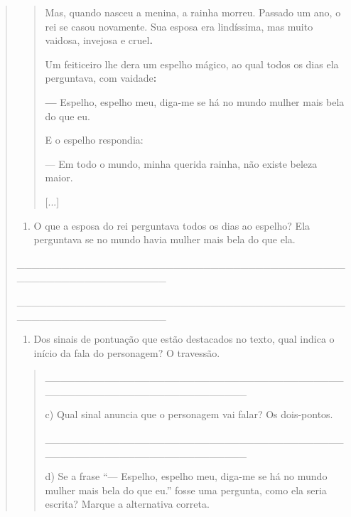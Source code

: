 \begin{quote}
\begin{iteize}
\begin{quote}
Mas, quando nasceu a menina, a rainha morreu. Passado um ano, o rei se
casou novamente. Sua esposa era lindíssima, mas muito vaidosa, invejosa
e cruel\textbf{.}

Um feiticeiro lhe dera um espelho mágico, ao qual todos os dias ela
perguntava, com vaidade\textbf{:}

\textbf{---} Espelho, espelho meu, diga-me se há no mundo mulher mais bela do que
eu.

E o espelho respondia:

--- Em todo o mundo, minha querida rainha, não existe beleza maior.

{[}...{]}

\end{quote}

\begin{enumerate}
\def\labelenumi{\alph{enumi})}
\item
  O que a esposa do rei perguntava todos os dias ao espelho? Ela
  perguntava se no mundo havia mulher mais bela do que ela.
\end{enumerate}

\_\_\_\_\_\_\_\_\_\_\_\_\_\_\_\_\_\_\_\_\_\_\_\_\_\_\_\_\_\_\_\_\_\_\_\_\_\_\_\_\_\_\_\_\_\_\_\_\_\_\_\_\_\_\_\_\_\_\_\_\_\_\_\_

\_\_\_\_\_\_\_\_\_\_\_\_\_\_\_\_\_\_\_\_\_\_\_\_\_\_\_\_\_\_\_\_\_\_\_\_\_\_\_\_\_\_\_\_\_\_\_\_\_\_\_\_\_\_\_\_\_\_\_\_\_\_\_\_

\begin{enumerate}
\def\labelenumi{\alph{enumi})}
\item
  Dos sinais de pontuação que estão destacados no texto, qual indica o
  início da fala do personagem? O travessão.
\end{enumerate}

\begin{quote}
\protect\hypertarget{_Hlk127463829}{}{}\_\_\_\_\_\_\_\_\_\_\_\_\_\_\_\_\_\_\_\_\_\_\_\_\_\_\_\_\_\_\_\_\_\_\_\_\_\_\_\_\_\_\_\_\_\_\_\_\_\_\_\_\_\_\_\_\_\_\_\_\_\_\_\_\_\_\_

c) Qual sinal anuncia que o personagem vai falar? Os dois-pontos.

\_\_\_\_\_\_\_\_\_\_\_\_\_\_\_\_\_\_\_\_\_\_\_\_\_\_\_\_\_\_\_\_\_\_\_\_\_\_\_\_\_\_\_\_\_\_\_\_\_\_\_\_\_\_\_\_\_\_\_\_\_\_\_\_\_\_\_

d) Se a frase ``--- Espelho, espelho meu, diga-me se há no mundo mulher
mais bela do que eu.'' fosse uma pergunta, como ela seria escrita?
Marque a alternativa correta.
\end{quote}


\end{iteize}
\end{quote}
